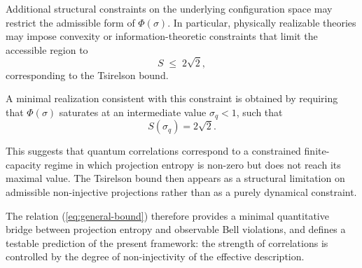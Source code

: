   Additional structural constraints on the underlying configuration space may restrict
  the admissible form of $\Phi(\sigma)$.
  In particular, physically realizable theories may impose convexity or information-theoretic
  constraints that limit the accessible region to
  \begin{equation}
    S \;\leq\; 2\sqrt{2},
  \end{equation}
  corresponding to the Tsirelson bound.

  A minimal realization consistent with this constraint is obtained by requiring that
  $\Phi(\sigma)$ saturates at an intermediate value $\sigma_q < 1$, such that
  \begin{equation}
    S(\sigma_q) = 2\sqrt{2}.
  \end{equation}

  This suggests that quantum correlations correspond to a constrained finite-capacity
  regime in which projection entropy is non-zero but does not reach its maximal value.
  The Tsirelson bound then appears as a structural limitation on admissible
  non-injective projections rather than as a purely dynamical constraint.

  The relation (\ref{eq:general-bound}) therefore provides a minimal quantitative bridge
  between projection entropy and observable Bell violations, and defines a testable
  prediction of the present framework: the strength of correlations is controlled by
  the degree of non-injectivity of the effective description.
